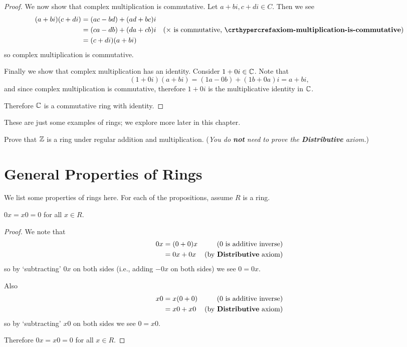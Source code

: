 \begin{proof}
    \newpage
     
    We now show that complex multiplication is commutative. Let $a+bi, c+di \in C$. Then we see
    \begin{align*}
        (a+bi)(c+di) &= (ac-bd) + (ad+bc)i\\
        &= (ca-db) + (da+cb)i & (\times\text{ is commutative, } \myref{axiom-multiplication-is-commutative})\\
        &= (c+di)(a+bi)
    \end{align*}
    so complex multiplication is commutative.

    Finally we show that complex multiplication has an identity. Consider $1 + 0i \in \mathbb{C}$. Note that
    \[
        (1+0i)(a+bi) = (1a-0b) + (1b+0a)i = a+bi,
    \]
    and since complex multiplication is commutative, therefore $1+0i$ is the multiplicative identity in $\mathbb{C}$.
    
    Therefore $\mathbb{C}$ is a commutative ring with identity.
\end{proof}

These are just some examples of rings; we explore more later in this chapter.
\begin{exercise}\label{exercise-ring-of-integers-is-a-ring}
    Prove that $\mathbb{Z}$ is a ring under regular addition and multiplication.\newline
    (\textit{You do \textbf{not} need to prove the \textbf{Distributive} axiom.})
\end{exercise}

\section{General Properties of Rings}
We list some properties of rings here. For each of the propositions, assume $R$ is a ring.

\begin{proposition}\label{prop-multiplying-by-zero-is-zero}
    $0x = x0 = 0$ for all $x \in R$.
\end{proposition}
\begin{proof}
    We note that
    \begin{align*}
        0x &= (0 + 0)x & (0 \text{ is additive inverse})\\
        &= 0x + 0x & (\text{by \textbf{Distributive} axiom})
    \end{align*}
    so by `subtracting' $0x$ on both sides (i.e., adding $-0x$ on both sides) we see $0 = 0x$.
    
    Also
    \begin{align*}
        x0 &= x(0 + 0) & (0 \text{ is additive inverse})\\
        &= x0 + x0 & (\text{by \textbf{Distributive} axiom})
    \end{align*}
    so by `subtracting' $x0$ on both sides we see $0 = x0$.
    
    Therefore $0x = x0 = 0$ for all $x \in R$.
\end{proof}

